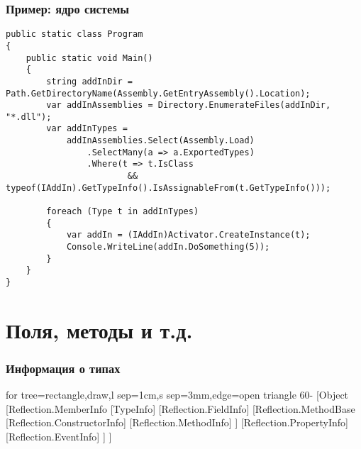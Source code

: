 \documentclass[xetex,mathserif,serif]{beamer}
\begin{document}
	\begin{frame}[fragile]
		\frametitle{Пример: ядро системы}
		\begin{scriptsize}
			\begin{verbatim}
public static class Program
{
    public static void Main()
    {
        string addInDir = Path.GetDirectoryName(Assembly.GetEntryAssembly().Location);
        var addInAssemblies = Directory.EnumerateFiles(addInDir, "*.dll");
        var addInTypes =
            addInAssemblies.Select(Assembly.Load)
                .SelectMany(a => a.ExportedTypes)
                .Where(t => t.IsClass 
                        && typeof(IAddIn).GetTypeInfo().IsAssignableFrom(t.GetTypeInfo()));

        foreach (Type t in addInTypes)
        {
            var addIn = (IAddIn)Activator.CreateInstance(t);
            Console.WriteLine(addIn.DoSomething(5));
        }
    }
}
			\end{verbatim}
		\end{scriptsize}
	\end{frame}

	\section{Поля, методы и т.д.}

	\begin{frame}
		\frametitle{Информация о типах}
		\begin{center}
			\begin{tiny}
				\begin{forest}
					for tree={rectangle,draw,l sep=1cm,s sep=3mm,edge=open triangle 60-}
					[Object
						[Reflection.MemberInfo
							[TypeInfo]
							[Reflection.FieldInfo]
							[Reflection.MethodBase
								[Reflection.ConstructorInfo]
								[Reflection.MethodInfo]
							]
							[Reflection.PropertyInfo]
							[Reflection.EventInfo]
						]
					]
				\end{forest}
			\end{tiny}
		\end{center}
	\end{frame}
\end{document}
